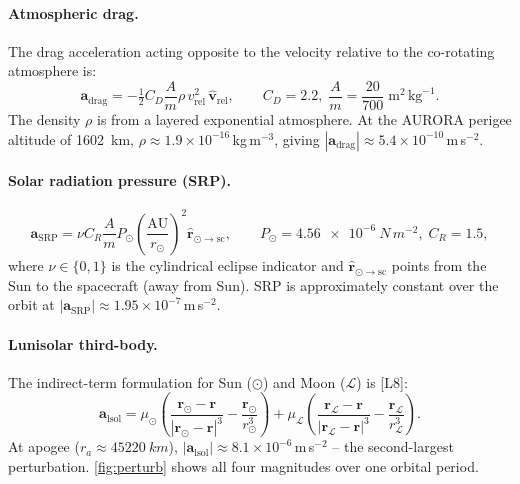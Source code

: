 \documentclass[11pt,a4paper]{article}
\newcommand{\bm}{\mathbf}
\begin{document}
\paragraph{Atmospheric drag.}
The drag acceleration acting opposite to the velocity relative to the co-rotating atmosphere is:
\begin{equation}
    \bm{a}_{\mathrm{drag}} = -\tfrac{1}{2}C_D\frac{A}{m}\rho\,v_{\mathrm{rel}}^2\,\hat{\bm{v}}_{\mathrm{rel}},
    \qquad C_D=2.2,\; \frac{A}{m}=\frac{20}{700}\;\text{m}^2\,\text{kg}^{-1}.
    \label{eq:drag}
\end{equation}
The density $\rho$ is from a layered exponential atmosphere. At the AURORA perigee altitude of \SI{1602}{km}, $\rho\approx 1.9\times10^{-16}$\,kg\,m$^{-3}$, giving $|\bm{a}_{\mathrm{drag}}|\approx 5.4\times10^{-10}$\,m\,s$^{-2}$.

\paragraph{Solar radiation pressure (SRP).}
\begin{equation}
    \bm{a}_{\mathrm{SRP}} = \nu C_R \frac{A}{m} P_\odot \left(\frac{\mathrm{AU}}{r_\odot}\right)^{\!2} \hat{\bm{r}}_{\odot\to\mathrm{sc}},
    \qquad P_\odot = \SI{4.56e-6}{N\,m^{-2}},\; C_R=1.5,
    \label{eq:srp}
\end{equation}
where $\nu\in\{0,1\}$ is the cylindrical eclipse indicator and $\hat{\bm{r}}_{\odot\to\mathrm{sc}}$ points from the Sun to the spacecraft (away from Sun). SRP is approximately constant over the orbit at $|\bm{a}_{\mathrm{SRP}}|\approx1.95\times10^{-7}$\,m\,s$^{-2}$.

\paragraph{Lunisolar third-body.}
The indirect-term formulation for Sun ($\odot$) and Moon ($\mathcal{L}$) is [L8]:
\begin{equation}
    \bm{a}_{\mathrm{lsol}} = \mu_\odot\!\left(\frac{\bm{r}_\odot-\bm{r}}{|\bm{r}_\odot-\bm{r}|^3} - \frac{\bm{r}_\odot}{r_\odot^3}\right)
    + \mu_\mathcal{L}\!\left(\frac{\bm{r}_\mathcal{L}-\bm{r}}{|\bm{r}_\mathcal{L}-\bm{r}|^3} - \frac{\bm{r}_\mathcal{L}}{r_\mathcal{L}^3}\right).
    \label{eq:lsol}
\end{equation}
At apogee ($r_a\approx\SI{45220}{km}$), $|\bm{a}_{\mathrm{lsol}}|\approx8.1\times10^{-6}$\,m\,s$^{-2}$ -- the second-largest perturbation. \cref{fig:perturb} shows all four magnitudes over one orbital period.
\end{document}
